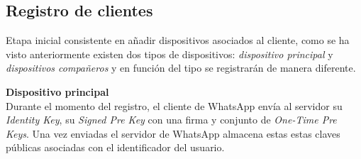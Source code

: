 \subsection{Registro de clientes}
Etapa inicial consistente en añadir dispositivos asociados al cliente, como se ha visto anteriormente existen dos tipos de dispositivos: \emph{dispositivo principal} y \emph{dispositivos compañeros} y en función del tipo se registrarán de manera diferente.
\begin{description}
	\item \textbf{Dispositivo principal}\\
	Durante el momento del registro, el cliente de WhatsApp envía al servidor su \emph{Identity Key}, su \emph{Signed Pre Key} con una firma y conjunto de \emph{One-Time Pre Keys}. Una vez enviadas el servidor de WhatsApp almacena estas estas claves públicas asociadas con el identificador del usuario.


\end{description}

